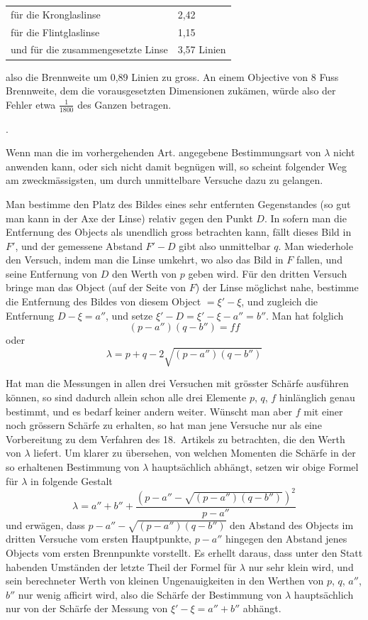 \documentclass[11pt,a4paper]{article}
\begin{document}
\begin{center}
\begin{tabular}{ll}
für die Kronglaslinse & 2,42 \\
für die Flintglaslinse & 1,15 \\
und für die zusammengesetzte Linse & 3,57 Linien
\end{tabular}
\end{center}

also die Brennweite um 0,89 Linien zu gross. An einem Objective von 8 Fuss Brennweite, dem die vorausgesetzten Dimensionen zukämen, würde also der Fehler etwa $\frac{1}{1800}$ des Ganzen betragen.

\bigskip{}.

\smallskip
Wenn man die im vorhergehenden Art. angegebene Bestimmungsart von $\lambda$ nicht anwenden kann, oder sich nicht damit begnügen will, so scheint folgender Weg am zweckmässigsten, um durch unmittelbare Versuche dazu zu gelangen.

Man bestimme den Platz des Bildes eines sehr entfernten Gegenstandes (so gut man kann in der Axe der Linse) relativ gegen den Punkt $D$. In sofern man die Entfernung des Objects als unendlich gross betrachten kann, fällt dieses Bild in $F'$, und der gemessene Abstand $F' - D$ gibt also unmittelbar $q$. Man wiederhole den Versuch, indem man die Linse umkehrt, wo also das Bild in $F$ fallen, und seine Entfernung von $D$ den Werth von $p$ geben wird. Für den dritten Versuch bringe man das Object (auf der Seite von $F$) der Linse möglichst nahe, bestimme die Entfernung des Bildes von diesem Object $= \xi' - \xi$, und zugleich die Entfernung $D - \xi = a''$, und setze $\xi' - D = \xi' - \xi - a'' = b''$. Man hat folglich
\[
(p - a'')(q - b'') = ff
\]
oder
\[
\lambda = p + q - 2\sqrt{(p - a'')(q - b'')}
\]

Hat man die Messungen in allen drei Versuchen mit grösster Schärfe ausführen können, so sind dadurch allein schon alle drei Elemente $p$, $q$, $f$ hinlänglich genau bestimmt, und es bedarf keiner andern weiter. Wünscht man aber $f$ mit einer noch grössern Schärfe zu erhalten, so hat man jene Versuche nur als eine Vorbereitung zu dem Verfahren des 18.~Artikels zu betrachten, die den Werth von $\lambda$ liefert. Um klarer zu übersehen, von welchen Momenten die Schärfe in der so erhaltenen Bestimmung von $\lambda$ hauptsächlich abhängt, setzen wir obige Formel für $\lambda$ in folgende Gestalt
\[
\lambda = a'' + b'' + \frac{(p - a'' - \sqrt{(p - a'')(q - b'')})^2}{p - a''}
\]
und erwägen, dass $p - a'' - \sqrt{(p - a'')(q - b'')}$ den Abstand des Objects im dritten Versuche vom ersten Hauptpunkte, $p - a''$ hingegen den Abstand jenes Objects vom ersten Brennpunkte vorstellt. Es erhellt daraus, dass unter den Statt habenden Umständen der letzte Theil der Formel für $\lambda$ nur sehr klein wird, und sein berechneter Werth von kleinen Ungenauigkeiten in den Werthen von $p$, $q$, $a''$, $b''$ nur wenig afficirt wird, also die Schärfe der Bestimmung von $\lambda$ hauptsächlich nur von der Schärfe der Messung von $\xi' - \xi = a'' + b''$ abhängt.
\end{document}
